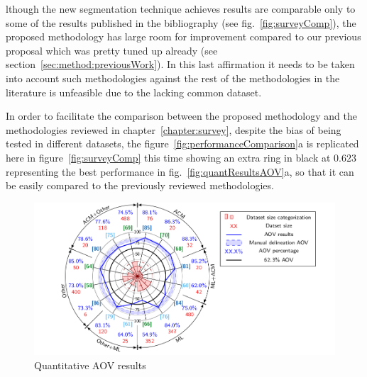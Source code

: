 lthough the new segmentation technique achieves results are comparable only to some of the results published in the bibliography (see fig.~\ref{fig:surveyComp}), the proposed methodology has large room for improvement compared to our previous proposal which was pretty tuned up already (see section~\ref{sec:method:previousWork}). In this last affirmation it needs to be taken into account such methodologies against the rest of the methodologies in the literature is unfeasible due to the lacking common dataset. 



In order to facilitate the comparison between the proposed methodology and the methodologies reviewed in chapter~\ref{chapter:survey}, despite the bias of being tested in different datasets, the figure~\ref{fig:performanceComparison}a is replicated here in figure~\ref{fig:surveyComp} this time showing an extra ring in black at $0.623$ representing the best performance in fig.~\ref{fig:quantResultsAOV}a, so that it can be easily compared to the previously reviewed methodologies.


\begin{figure}[h]
  \centering
  \includegraphics[width=0.8\linewidth]{results}
  \caption{Quantitative AOV results}
  \label{fig:surveyResults}
\end{figure}
